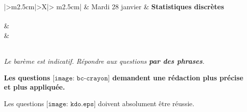 \documentclass[10pt,french]{book}
\newcommand\Kdo[1][1em]{$\texttt{[image: kdo.eps]}\hspace{#1}$}
\newcommand\Red[1][1em]{$\texttt{[image: bc-crayon]}\hspace{#1}$}
\begin{document}
\begin{center}
\begin{tabularx}{\textwidth}{|>\centering m{2.5cm}|>\centering X|>{\centering\arraybackslash} m{2.5cm}|}
	\hline
		 &  Mardi 28 janvier  & \textbf{Statistiques discrètes} \\
	\hline
		 \\
	\hline
         &  \\
		 &  \\
	\hline
         \\[1cm]
    \hline
\end{tabularx}\medskip

{\itshape
\small
Le barème est indicatif. Répondre aux questions \textbf{par des phrases}.\par
{\bfseries Les questions \Red[0pt] demandent une rédaction plus précise et plus appliquée.}\par
Les questions \Kdo[0pt] doivent absolument être réussie.
}
\end{center}
\end{document}
